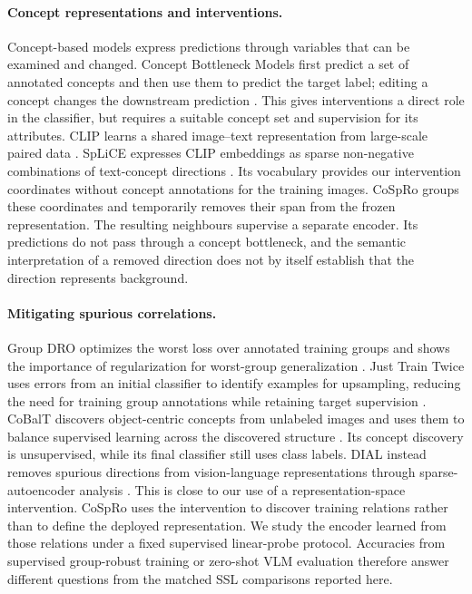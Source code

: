 \documentclass{article}
\begin{document}
\paragraph{Concept representations and interventions.}
Concept-based models express predictions through variables that can be examined
and changed. Concept Bottleneck Models first predict a set of annotated concepts
and then use them to predict the target label; editing a concept changes the
downstream prediction \citep{koh2020cbm}. This gives interventions a direct role
in the classifier, but requires a suitable concept set and supervision for its
attributes. CLIP learns a shared image--text representation from large-scale
paired data \citep{radford2021clip}. SpLiCE expresses CLIP embeddings as sparse
non-negative combinations of text-concept directions
\citep{bhalla2024splice}. Its vocabulary provides our intervention coordinates
without concept annotations for the training images. CoSpRo groups these
coordinates and temporarily removes their span from the frozen representation.
The resulting neighbours supervise a separate encoder. Its predictions do not
pass through a concept bottleneck, and the semantic interpretation of a removed
direction does not by itself establish that the direction represents background.

\paragraph{Mitigating spurious correlations.}
Group DRO optimizes the worst loss over annotated training groups and shows the
importance of regularization for worst-group generalization
\citep{sagawa2020groupdro}. Just Train Twice uses errors from an initial
classifier to identify examples for upsampling, reducing the need for training
group annotations while retaining target supervision \citep{liu2021jtt}.
CoBalT discovers object-centric concepts from unlabeled images and uses them to
balance supervised learning across the discovered structure
\citep{arefin2024cobalt}. Its concept discovery is unsupervised, while its final
classifier still uses class labels. DIAL instead removes spurious directions
from vision-language representations through sparse-autoencoder analysis
\citep{yalavarthi2026dial}. This is close to our use of a representation-space
intervention. CoSpRo uses the intervention to discover training relations rather
than to define the deployed representation. We study the encoder learned from
those relations under a fixed supervised linear-probe protocol. Accuracies from
supervised group-robust training or zero-shot VLM evaluation therefore answer
different questions from the matched SSL comparisons reported here.
\end{document}
